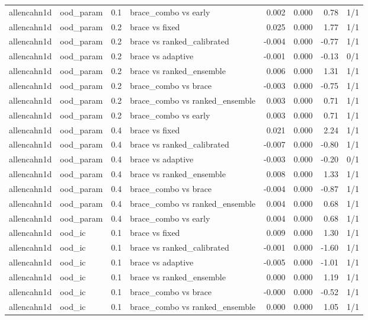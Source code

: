 \begin{tabular}{llllrrrr}
allencahn1d & ood\_param & 0.1 & brace\_combo vs early & 0.002 & 0.000 & 0.78 & 1/1 \\
allencahn1d & ood\_param & 0.2 & brace vs fixed & 0.025 & 0.000 & 1.77 & 1/1 \\
allencahn1d & ood\_param & 0.2 & brace vs ranked\_calibrated & -0.004 & 0.000 & -0.77 & 1/1 \\
allencahn1d & ood\_param & 0.2 & brace vs adaptive & -0.001 & 0.000 & -0.13 & 0/1 \\
allencahn1d & ood\_param & 0.2 & brace vs ranked\_ensemble & 0.006 & 0.000 & 1.31 & 1/1 \\
allencahn1d & ood\_param & 0.2 & brace\_combo vs brace & -0.003 & 0.000 & -0.75 & 1/1 \\
allencahn1d & ood\_param & 0.2 & brace\_combo vs ranked\_ensemble & 0.003 & 0.000 & 0.71 & 1/1 \\
allencahn1d & ood\_param & 0.2 & brace\_combo vs early & 0.003 & 0.000 & 0.71 & 1/1 \\
allencahn1d & ood\_param & 0.4 & brace vs fixed & 0.021 & 0.000 & 2.24 & 1/1 \\
allencahn1d & ood\_param & 0.4 & brace vs ranked\_calibrated & -0.007 & 0.000 & -0.80 & 1/1 \\
allencahn1d & ood\_param & 0.4 & brace vs adaptive & -0.003 & 0.000 & -0.20 & 0/1 \\
allencahn1d & ood\_param & 0.4 & brace vs ranked\_ensemble & 0.008 & 0.000 & 1.33 & 1/1 \\
allencahn1d & ood\_param & 0.4 & brace\_combo vs brace & -0.004 & 0.000 & -0.87 & 1/1 \\
allencahn1d & ood\_param & 0.4 & brace\_combo vs ranked\_ensemble & 0.004 & 0.000 & 0.68 & 1/1 \\
allencahn1d & ood\_param & 0.4 & brace\_combo vs early & 0.004 & 0.000 & 0.68 & 1/1 \\
allencahn1d & ood\_ic & 0.1 & brace vs fixed & 0.009 & 0.000 & 1.30 & 1/1 \\
allencahn1d & ood\_ic & 0.1 & brace vs ranked\_calibrated & -0.001 & 0.000 & -1.60 & 1/1 \\
allencahn1d & ood\_ic & 0.1 & brace vs adaptive & -0.005 & 0.000 & -1.01 & 1/1 \\
allencahn1d & ood\_ic & 0.1 & brace vs ranked\_ensemble & 0.000 & 0.000 & 1.19 & 1/1 \\
allencahn1d & ood\_ic & 0.1 & brace\_combo vs brace & -0.000 & 0.000 & -0.52 & 1/1 \\
allencahn1d & ood\_ic & 0.1 & brace\_combo vs ranked\_ensemble & 0.000 & 0.000 & 1.05 & 1/1 \\

\end{tabular}
